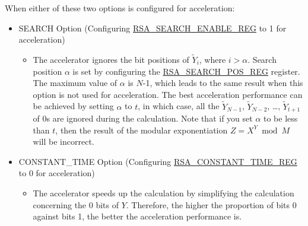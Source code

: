 \documentclass[main\_\_EN.tex]{subfiles}
\begin{document}
When either of these two options is configured for acceleration:

\begin{itemize}
 \item SEARCH Option (Configuring \hyperref[regdesc:RSASEARCHENABLEREG]{RSA\_SEARCH\_ENABLE\_REG} to 1 for acceleration)
    \begin{itemize}
        \item The accelerator ignores the bit positions of \begin{math} \widetilde{Y}_{i} \end{math}, where \begin{math} i > \alpha \end{math}. Search position \begin{math} \alpha \end{math} is set by configuring the \hyperref[regdesc:RSASEARCHPOSREG]{RSA\_SEARCH\_POS\_REG} register. The maximum value of \begin{math} \alpha \end{math} is \begin{math}N\end{math}-1, which leads to the same result when this option is not used for acceleration. The best acceleration performance can be achieved by setting \begin{math} \alpha \end{math} to \begin{math} t \end{math}, in which case, all the \begin{math}\widetilde{Y}_{N-1}\end{math}, \begin{math}\widetilde{Y}_{N-2}\end{math}, \dots, \begin{math}\widetilde{Y}_{t+1}\end{math} of 0s are ignored during the calculation. Note that if you set \begin{math} \alpha \end{math} to be less than \begin{math} t \end{math}, then the result of the modular exponentiation \begin{math}Z = X^{Y} \bmod M \end{math} will be incorrect.
    \end{itemize}
\item CONSTANT\_TIME Option (Configuring \hyperref[regdesc:RSACONSTANTTIMEREG]{RSA\_CONSTANT\_TIME\_REG} to 0 for acceleration)
    \begin{itemize}
        \item The accelerator speeds up the calculation by simplifying the calculation concerning the 0 bits of \begin{math} Y \end{math}. Therefore, the higher the proportion of bits 0 against bits 1, the better the acceleration performance is.
    \end{itemize}
\end{itemize}
\end{document}
